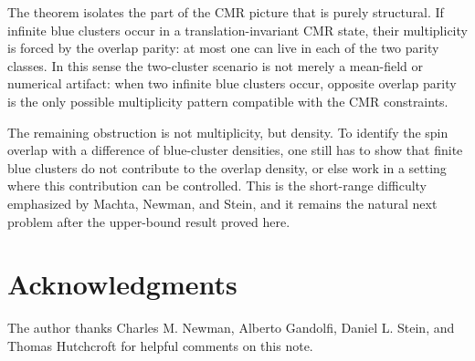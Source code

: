 \documentclass[11pt]{article}
\numberwithin{theorem}{section}
\theoremstyle{remark}
\begin{document}
The theorem isolates the part of the CMR picture that is purely structural.
If infinite blue clusters occur in a translation-invariant CMR state, their multiplicity is forced by the overlap parity: at most one can live in each of the two parity classes.
In this sense the two-cluster scenario is not merely a mean-field or numerical artifact: when two infinite blue clusters occur, opposite overlap parity is the only possible multiplicity pattern compatible with the CMR constraints.

The remaining obstruction is not multiplicity, but density.
To identify the spin overlap with a difference of blue-cluster densities, one still has to show that finite blue clusters do not contribute to the overlap density, or else work in a setting where this contribution can be controlled.
This is the short-range difficulty emphasized by Machta, Newman, and Stein, and it remains the natural next problem after the upper-bound result proved here.


\section*{Acknowledgments}
The author thanks Charles M. Newman, Alberto Gandolfi, Daniel L. Stein, and Thomas Hutchcroft for helpful comments on this note.



\end{document}

